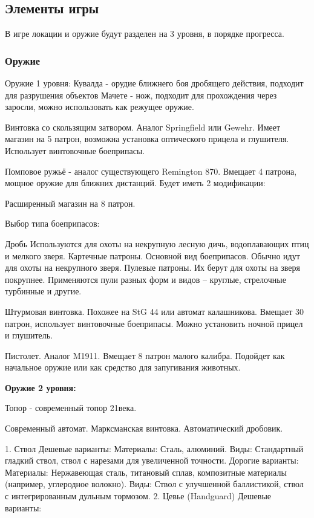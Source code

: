 \documentclass[a4paper,12pt]{article}
\begin{document}
\subsection{Элементы игры}
В игре локации и оружие будут разделен на 3 уровня, в порядке прогресса. 
\subsubsection{Оружие}
Оружие 1 уровня:
Кувалда - орудие ближнего боя дробящего действия, подходит для разрушения объектов
Мачете - нож, подходит для прохождения через заросли, можно использовать как режущее оружие.

Винтовка со скользящим затвором. Аналог Springfield или Gewehr. Имеет магазин на 5 патрон, возможна установка оптического прицела и глушителя. Использует винтовочные боеприпасы.

Помповое ружьё - аналог существующего Remington 870. Вмещает 4 патрона, мощное оружие для ближних дистанций. Будет иметь 2 модификации:

Расширенный магазин на 8 патрон.

Выбор типа боеприпасов:

Дробь Используются для охоты на некрупную лесную дичь, водоплавающих птиц и мелкого зверя.
Картечные патроны. Основной вид боеприпасов. Обычно идут для охоты на некрупного зверя.
Пулевые патроны. Их берут для охоты на зверя покрупнее. Применяются пули разных форм и видов – круглые, стрелочные турбинные и другие.

Штурмовая винтовка. Похожее на StG 44 или автомат калашникова. Вмещает 30 патрон, использует винтовочные боеприпасы. Можно установить ночной прицел и глушитель.

Пистолет. Аналог M1911. Вмещает 8 патрон малого калибра. Подойдет как начальное оружие или как средство для запугивания животных.

\textbf{Оружие 2 уровня:}

Топор - современный топор 21века. 

Современный автомат.
Марксманская винтовка.
Автоматический дробовик.

1. Ствол
Дешевые варианты:
Материалы: Сталь, алюминий.
Виды: Стандартный гладкий ствол, ствол с нарезами для увеличенной точности.
Дорогие варианты:
Материалы: Нержавеющая сталь, титановый сплав, композитные материалы (например, углеродное волокно).
Виды: Ствол с улучшенной баллистикой, ствол с интегрированным дульным тормозом.
2. Цевье (Handguard)
Дешевые варианты:
\end{document}
